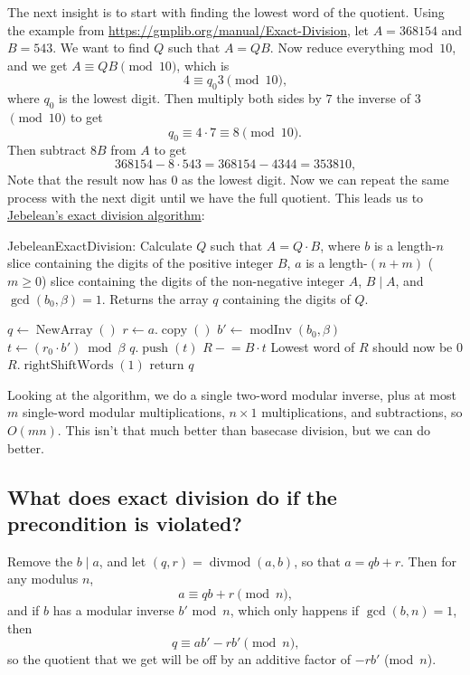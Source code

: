 \documentclass{computer-arithmetic}
\begin{document}
The next insight is to start with finding the lowest word of the
quotient. Using the example from
\url{https://gmplib.org/manual/Exact-Division}, let \(A = 368154\) and
\(B = 543\). We want to find \(Q\) such that \(A = QB\). Now reduce
everything mod~\(10\), and we get \(A ≡ QB \pmod{10}\), which is
\[
  4 ≡ q_0 3 \pmod{10}\text{,}
\]
where \(q_0\) is the lowest digit. Then multiply both sides by \(7\) the
inverse of \(3\) \(\pmod{10}\) to get
\[
  q_0 ≡ 4 ⋅ 7 ≡ 8 \pmod{10}\text{.}
\]
Then subtract \(8B\) from \(A\) to get
\[
  368154 - 8 ⋅ 543 = 368154 - 4344 = 353810\text{,}
\]
Note that the result now has \(0\) as the lowest digit. Now we can
repeat the same process with the next digit until we have the full
quotient. This leads us to
\href{https://www.sciencedirect.com/science/article/pii/S0747717183710126}{Jebelean's
  exact division algorithm}:

\begin{algorithm}
  \caption{JebeleanExactDivision: Calculate \(Q\) such that
    \(A = Q ⋅ B\), where \(b\) is a length-\(n\) slice containing the
    digits of the positive integer \(B\), \(a\) is a
    length-\((n + m)\) (\(m ≥ 0\)) slice containing the digits of the
    non-negative integer \(A\), \(B \mid A\), and
    \(\gcd(b_0, β) = 1\). Returns the array \(q\) containing the
    digits of \(Q\).}
  \begin{algorithmic}[1]
    \State \(q ← \operatorname{NewArray}()\)
    \State \(r ← a.\operatorname{copy}()\)
    \State \(b' ← \operatorname{modInv}(b_0, β)\)
    \State \(t ← (r_0 ⋅ b') \bmod β\)
    \State \(q.\operatorname{push}(t)\)
    \State \(R \mathrel{-}= B ⋅ t\)
    \Comment Lowest word of \(R\) should now be \(0\)
    \State \(R.\operatorname{rightShiftWords}(1)\)
    \EndWhile
    \State return \(q\)
\end{algorithmic}
\end{algorithm}

Looking at the algorithm, we do a single two-word modular inverse,
plus at most \(m\) single-word modular multiplications, \(n × 1\)
multiplications, and subtractions, so \(O(mn)\). This isn't that much
better than basecase division, but we can do better.

\subsection{What does exact division do if the precondition is violated?}

Remove the \(b \mid a\), and let
\((q, r) = \operatorname{divmod}(a, b)\), so that \(a = qb + r\). Then
for any modulus \(n\),
\[
  a ≡ qb + r \pmod n\text{,}
\]
and if \(b\) has a modular inverse \(b'\) mod~\(n\), which only
happens if \(\gcd(b, n) = 1\), then
\[
  q ≡ ab' - rb' \pmod n\text{,}
\]
so the quotient that we get will be off by an additive factor of
\(-rb'\) (mod~\(n\)).
\end{document}
